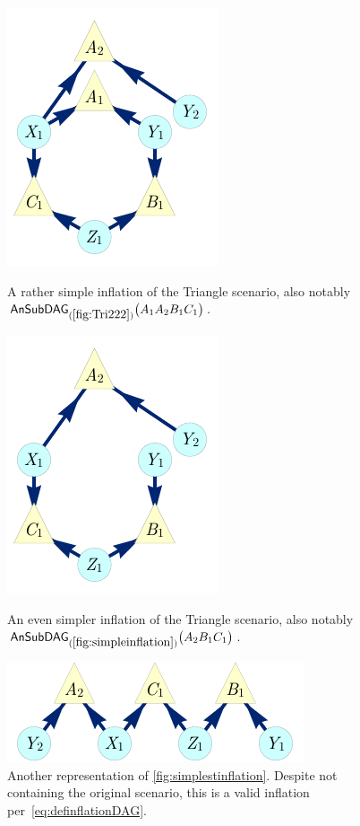 \begin{figure}[hb]
\centering
\begin{minipage}[t]{0.3\linewidth}
\centering
\includegraphics[scale=1]{broadcastingexamplenohighlightALT.pdf}
\caption{A rather simple inflation of the Triangle scenario, also notably $\ansubgraph[(\cref{fig:Tri222})]{A_1 A_2 B_1 C_1}$.}\label{fig:simpleinflation}
\end{minipage}\hfill
\begin{minipage}[t]{0.275\linewidth}
\centering
\includegraphics[scale=1]{nobroadcastingexamplenohighlightALT.pdf}
\caption{An even simpler inflation of the Triangle scenario, also notably $\ansubgraph[(\cref{fig:simpleinflation})]{A_2 B_1 C_1}$. }\label{fig:simplestinflation}
\end{minipage}
\hfill
\begin{minipage}[t]{0.325\linewidth}
\centering
\includegraphics[scale=1]{TriDagSubA2B1C1.pdf}
\caption{Another representation of \cref{fig:simplestinflation}. Despite not containing the original scenario, this is a valid inflation per~\cref{eq:definflationDAG}.}\label{fig:TriDagSubA2B1C1}
\end{minipage}
\end{figure}

